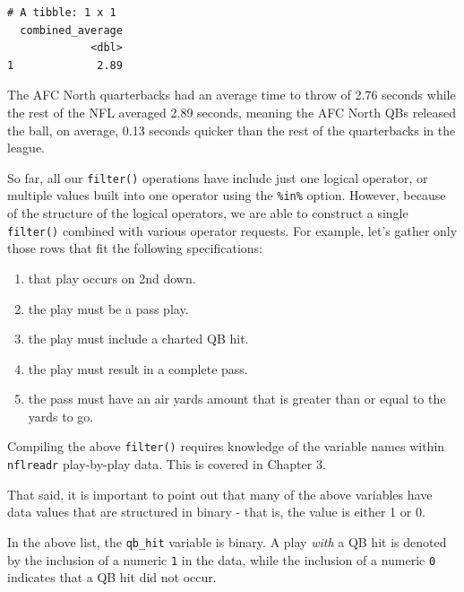 \documentclass[
  letterpaper,
]{krantz}
\providecommand{\tightlist}{%
  \setlength{\itemsep}{0pt}\setlength{\parskip}{0pt}}\usepackage{longtable,booktabs,array}
\begin{document}
\begin{verbatim}
# A tibble: 1 x 1
  combined_average
             <dbl>
1             2.89
\end{verbatim}

The AFC North quarterbacks had an average time to throw of 2.76 seconds
while the rest of the NFL averaged 2.89 seconds, meaning the AFC North
QBs released the ball, on average, 0.13 seconds quicker than the rest of
the quarterbacks in the league.

So far, all our \texttt{filter()} operations have include just one
logical operator, or multiple values built into one operator using the
\texttt{\%in\%} option. However, because of the structure of the logical
operators, we are able to construct a single \texttt{filter()} combined
with various operator requests. For example, let's gather only those
rows that fit the following specifications:

\begin{enumerate}
\def\labelenumi{\arabic{enumi}.}
\tightlist
\item
  that play occurs on 2nd down.
\item
  the play must be a pass play.
\item
  the play must include a charted QB hit.
\item
  the play must result in a complete pass.
\item
  the pass must have an air yards amount that is greater than or equal
  to the yards to go.
\end{enumerate}

\begin{tcolorbox}[enhanced jigsaw, colback=white, leftrule=.75mm, breakable, colframe=quarto-callout-tip-color-frame, bottomtitle=1mm, rightrule=.15mm, left=2mm, opacityback=0, bottomrule=.15mm, arc=.35mm, coltitle=black, colbacktitle=quarto-callout-tip-color!10!white, toptitle=1mm, titlerule=0mm, title=\textcolor{quarto-callout-tip-color}{\faLightbulb}\hspace{0.5em}{Tip}, toprule=.15mm, opacitybacktitle=0.6]

Compiling the above \texttt{filter()} requires knowledge of the variable
names within \texttt{nflreadr} play-by-play data. This is covered in
Chapter 3.

That said, it is important to point out that many of the above variables
have data values that are structured in binary - that is, the value is
either 1 or 0.

In the above list, the \texttt{qb\_hit} variable is binary. A play
\emph{with} a QB hit is denoted by the inclusion of a numeric \texttt{1}
in the data, while the inclusion of a numeric \texttt{0} indicates that
a QB hit did not occur.

\end{tcolorbox}
\end{document}
